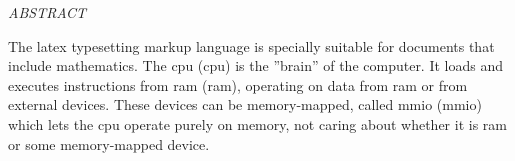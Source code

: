 \begin{center}
\normalfont\LARGE\textit{ABSTRACT}\normalsize
\end{center}

The \Gls{latex} typesetting markup language is specially suitable for documents that include mathematics.
The \acrlong{cpu} (\acrshort{cpu}) is the ''brain'' of the computer.
It loads and executes instructions from \acrlong{ram} (\acrshort{ram}), operating on data from \acrshort{ram} or from external devices.
These devices can be memory-mapped, called \acrlong{mmio} (\acrshort{mmio}) which lets the \acrshort{cpu} operate purely on memory, not caring about whether it is \acrshort{ram} or some memory-mapped device.

\newpage
